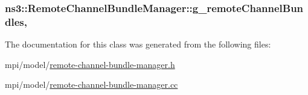 \subsubsection[{\texorpdfstring{g\+\_\+remote\+Channel\+Bundles}{g_remoteChannelBundles}}]{ ns3\+::\+Remote\+Channel\+Bundle\+Manager\+::g\+\_\+remote\+Channel\+Bundles\hspace{0.3cm}{\ttfamily [static]}, {\ttfamily [private]}}\hypertarget{classns3_1_1RemoteChannelBundleManager_a4a3b963438e1f5a01a7bb0ae6feccba5}{}\label{classns3_1_1RemoteChannelBundleManager_a4a3b963438e1f5a01a7bb0ae6feccba5}


The documentation for this class was generated from the following files\+:\begin{DoxyCompactItemize}
\item 
mpi/model/\hyperlink{remote-channel-bundle-manager_8h}{remote-\/channel-\/bundle-\/manager.\+h}\item 
mpi/model/\hyperlink{remote-channel-bundle-manager_8cc}{remote-\/channel-\/bundle-\/manager.\+cc}\end{DoxyCompactItemize}
